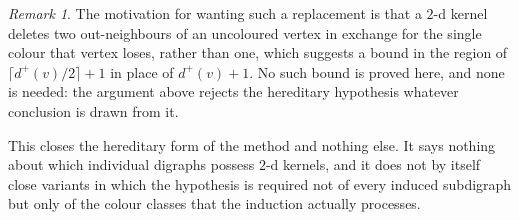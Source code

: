 \documentclass[11pt]{article}
\theoremstyle{plain}
\theoremstyle{definition}
\theoremstyle{remark}
\newtheorem{remark}[theorem]{Remark}
\begin{document}
\begin{remark}
The motivation for wanting such a replacement is that a $2$-d kernel deletes two
out-neighbours of an uncoloured vertex in exchange for the single colour that vertex loses,
rather than one, which suggests a bound in the region of $\lceil d^{+}(v)/2 \rceil + 1$ in
place of $d^{+}(v) + 1$. No such bound is proved here, and none is needed: the argument above
rejects the hereditary hypothesis whatever conclusion is drawn from it.

This closes the hereditary form of the method and nothing else. It says nothing about which
individual digraphs possess $2$-d kernels, and it does not by itself close variants in which
the hypothesis is required not of every induced subdigraph but only of the colour classes
that the induction actually processes.
\end{remark}
\end{document}
